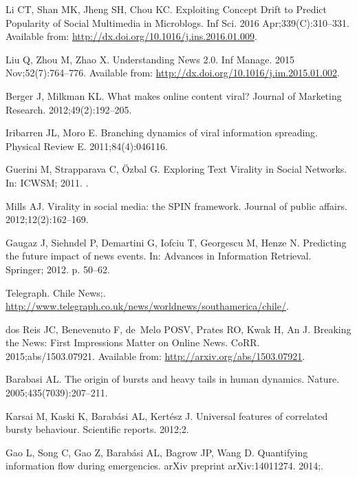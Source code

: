 \documentclass[10pt,letterpaper]{article}
\begin{document}
\begin{thebibliography}{10}
Li CT, Shan MK, Jheng SH, Chou KC.
\newblock Exploiting Concept Drift to Predict Popularity of Social Multimedia
  in Microblogs.
\newblock Inf Sci. 2016 Apr;339(C):310--331.
\newblock Available from: \url{http://dx.doi.org/10.1016/j.ins.2016.01.009}.

Liu Q, Zhou M, Zhao X.
\newblock Understanding News 2.0.
\newblock Inf Manage. 2015 Nov;52(7):764--776.
\newblock Available from: \url{http://dx.doi.org/10.1016/j.im.2015.01.002}.

Berger J, Milkman KL.
\newblock What makes online content viral?
\newblock Journal of Marketing Research. 2012;49(2):192--205.

Iribarren JL, Moro E.
\newblock Branching dynamics of viral information spreading.
\newblock Physical Review E. 2011;84(4):046116.

Guerini M, Strapparava C, {\"O}zbal G.
\newblock Exploring Text Virality in Social Networks.
\newblock In: ICWSM; 2011. .

Mills AJ.
\newblock Virality in social media: the SPIN framework.
\newblock Journal of public affairs. 2012;12(2):162--169.

Gaugaz J, Siehndel P, Demartini G, Iofciu T, Georgescu M, Henze N.
\newblock Predicting the future impact of news events.
\newblock In: Advances in Information Retrieval. Springer; 2012. p. 50--62.

{Telegraph}. Chile News;.
\newblock \url{http://www.telegraph.co.uk/news/worldnews/southamerica/chile/}.

dos Reis JC, Benevenuto F, de~Melo POSV, Prates RO, Kwak H, An J.
\newblock Breaking the News: First Impressions Matter on Online News.
\newblock CoRR. 2015;abs/1503.07921.
\newblock Available from: \url{http://arxiv.org/abs/1503.07921}.

Barabasi AL.
\newblock The origin of bursts and heavy tails in human dynamics.
\newblock Nature. 2005;435(7039):207--211.

Karsai M, Kaski K, Barab{\'a}si AL, Kert{\'e}sz J.
\newblock Universal features of correlated bursty behaviour.
\newblock Scientific reports. 2012;2.

Gao L, Song C, Gao Z, Barab{\'a}si AL, Bagrow JP, Wang D.
\newblock Quantifying information flow during emergencies.
\newblock arXiv preprint arXiv:14011274. 2014;.


\end{thebibliography}
\end{document}
